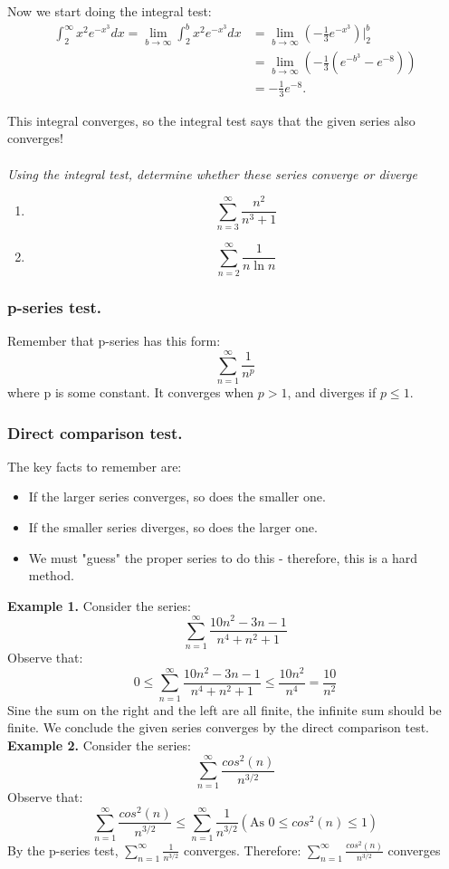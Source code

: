 \documentclass{article}
\begin{document}
Now we start doing the integral test: 
\begin{align*}
    \int_{2}^{\infty} x^{2} e^{-x^{3}} dx = \lim_{b\to\infty} \int_{2}^{b} x^{2} e^{-x^{3}} dx 
&= \lim_{b\to\infty} \left( -\frac{1}{3} e^{-x^{3}} \right) \Big|_{2}^{b} \\
&= \lim_{b \to \infty} \left( -\frac{1}{3} \left( e^{-b^{3}} - e^{-8} \right) \right) \\
&= -\frac{1}{3} e^{-8} .
\end{align*}

This integral converges, so the integral test says that the given series also converges! \\ \\
\textit{Using the integral test, determine whether these series converge or diverge} 
\begin{enumerate}
    \item $$ \sum_{n=3}^{\infty} \frac{n^2}{n^3 + 1}$$
    \item $$ \sum_{n=2}^{\infty} \frac{1}{n \ln{n}}$$
\end{enumerate}

\subsubsection{p-series test.}
Remember that p-series has this form: 
    $$ \sum_{n=1}^{\infty} \frac{1}{n^{p}}$$
    where p is some constant. It converges when $p > 1$, and diverges if $p \le 1$.


\subsubsection{Direct comparison test.} 
The key facts to remember are: 
\begin{itemize}
    \item If the larger series converges, so does the smaller one.
    \item If the smaller series diverges, so does the larger one. 
    \item We must "guess" the proper series to do this - therefore, this is a hard method. 
\end{itemize} 
\textbf{Example 1.} Consider the series: 
$$ \sum_{n=1}^{\infty} \frac{10n^2 - 3n -1}{n^4 + n^2 + 1}$$
Observe that: 
$$ 0 \leq \sum_{n=1}^{\infty} \frac{10n^2 - 3n -1}{n^4 + n^2 + 1} \leq \frac{10n^2}{n^4} = \frac{10}{n^2} $$
Sine the sum on the right and the left are all finite, the infinite sum should be finite. We conclude the given series converges by the direct comparison test. \\
\textbf{Example 2. } Consider the series: 
$$ \sum_{n=1}^{\infty} \frac{cos^2(n)}{n^{3/2}}$$
Observe that:
$$ \sum_{n=1}^{\infty} \frac{cos^2(n)}{n^{3/2}} \leq \sum_{n=1}^{\infty} \frac{1}{n^{3/2}}   (\text{As } 0 \leq cos^2(n) \leq 1)$$
By the p-series test, $\sum_{n=1}^{\infty} \frac{1}{n^{3/2}}$ converges. 
Therefore: $ \sum_{n=1}^{\infty} \frac{cos^2(n)}{n^{3/2}}$ converges
\end{document}
